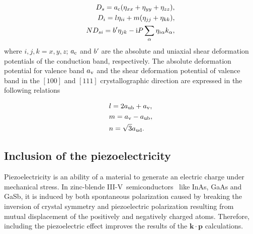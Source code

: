 \begin{eqnarray*}
	D_s=a_{\rm c}(\eta_{xx}+\eta_{yy}+\eta_{zz}),\nonumber\\
	D_i=l\eta_{ii}+m(\eta_{jj}+\eta_{kk}),\nonumber\\
	ND_{si}=b'\eta_{jk}-\mathrm{i}P\sum_\alpha\eta_{i\alpha}k_\alpha,\nonumber\\
\end{eqnarray*}
where $i,j,k=x,y,z$; $a_{\rm c}$ and $b'$ are the absolute and uniaxial shear deformation potentials of the conduction band, respectively. The absolute deformation potential for valence band $a_{\rm v}$ and the shear deformation potential of valence band in the $[100]$ and $[111]$ crystallographic direction are expressed in the following relations

\begin{eqnarray*}
	&l=2a_{\rm ub}+a_{\rm v},\nonumber\\
	&m=a_{\rm v}-a_{\rm ub},\nonumber\\
	&n=\sqrt{3}a_{\rm ud}.\nonumber\\
\end{eqnarray*}





\subsection{Inclusion of the piezoelectricity}
\label{subPiezo}



Piezoelectricity is an ability of a material to generate an electric charge under mechanical stress. In zinc-blende {III-V}~semiconductors~\citep{Hubner,Zeller,Gironcoli,KingSmith} like InAs, GaAs and GaSb, it is induced by both spontaneous polarization caused by breaking the inversion of crystal symmetry and piezoelectric polarization resulting from mutual displacement of the positively and negatively charged atoms. Therefore, including the piezoelectric effect improves the results of the $\mathbf{k}\cdot\mathbf{p}$ calculations.

